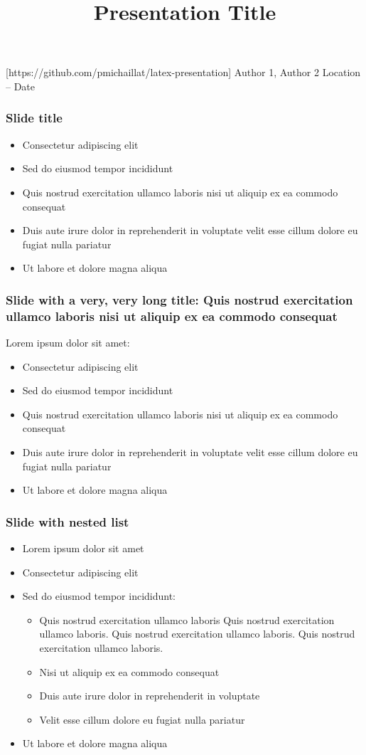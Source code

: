 \documentclass[11pt,xcolor={dvipsnames},hyperref={pdftex,pdfpagemode=UseNone,hidelinks,pdfdisplaydoctitle=true},usepdftitle=false]{beamer}
\begin{document}
\title{Presentation Title}
\information%
[https://github.com/pmichaillat/latex-presentation]%
{Author 1, Author 2}%
{Location -- Date}
\frame{\titlepage}

\begin{frame}
\frametitle{Slide title}
\begin{itemize}
\item Consectetur adipiscing elit
\item Sed do eiusmod tempor incididunt
\item Quis nostrud exercitation ullamco laboris nisi ut aliquip ex ea commodo consequat
\item Duis aute irure dolor in reprehenderit in voluptate velit esse cillum dolore eu fugiat nulla pariatur
\item Ut labore et dolore magna aliqua
\end{itemize}
\end{frame}

\begin{frame}
\frametitle{Slide with a very, very long title: Quis nostrud exercitation ullamco laboris nisi ut aliquip ex ea commodo consequat}
Lorem ipsum dolor sit amet:
\begin{itemize}
\item Consectetur adipiscing elit
\item Sed do eiusmod tempor incididunt
\item Quis nostrud exercitation ullamco laboris nisi ut aliquip ex ea commodo consequat
\item Duis aute irure dolor in reprehenderit in voluptate velit esse cillum dolore eu fugiat nulla pariatur
\item Ut labore et dolore magna aliqua
\end{itemize}
\end{frame}

\begin{frame}
\frametitle{Slide with nested list}
\begin{itemize}
\item Lorem ipsum dolor sit amet
\item Consectetur adipiscing elit
\item Sed do eiusmod tempor incididunt:
\begin{itemize}
\item Quis nostrud exercitation ullamco laboris Quis nostrud exercitation ullamco laboris. Quis nostrud exercitation ullamco laboris. Quis nostrud exercitation ullamco laboris.
\item Nisi ut aliquip ex ea commodo consequat
\item Duis aute irure dolor in reprehenderit in voluptate
\item Velit esse cillum dolore eu fugiat nulla pariatur
\end{itemize}
\item Ut labore et dolore magna aliqua
\end{itemize}
\end{frame}
\end{document}

